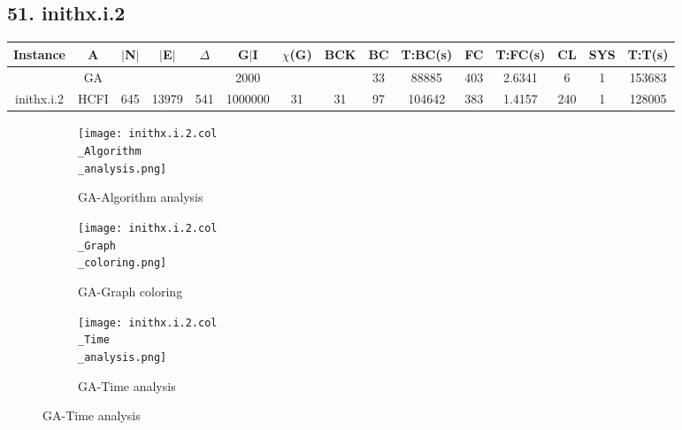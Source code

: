 \documentclass[10pt]{article}
\begin{document}
\subsection*{\hspace{0,9073976cm} 51. inithx.i.2}
\begin{table}[H]
\centering
\begin{tabular}{|c|c|c|c|c|c|c|c|c|c|c|c|c|c|c|}
\hline
Instance& A &$|$N$|$ & $|$E$|$ & $\Delta$ & G$|$I & $\chi$(G) &BCK&BC & T:BC(s) & FC & T:FC(s) & CL & SYS & T:T(s) \\ \hline \hline

	&GA&       &                   &                     &   2000     &     \cellcolor{yellow} & {\cellcolor{yellow}}& {{\cellcolor{green}33}}
&88885   &403        &2.6341                    &6                    &1          &153683         \\ \cline{2-2} \cline{6-6} \cline{9-15}
 \multirow{-2}{*}{inithx.i.2} &HCFI   &\multirow{-2}{*}{645}   &\multirow{-2}{*}{13979}     &\multirow{-2}{*}{541}     &1000000     &\multirow{-2}{*}{\cellcolor{yellow}31}      & \multirow{-2}{*}{\cellcolor{yellow}31}    &{\cellcolor{green}97}     &104642         &383    &1.4157         &240    &1     & 128005        \\ \hline
\end{tabular}
\end{table}
\graphicspath{{./Core1/Solutions/GA/inithx.i.2.col}}
\begin{figure}[H]
\begin{subfigure}{.33\textwidth}
  \centering
  \texttt{[image: inithx.i.2.col\\\_Algorithm\\\_analysis.png]}
  \caption{GA-Algorithm analysis}
   \label{fig:subfig1}
\end{subfigure}%
\begin{subfigure}{.33\textwidth}
  \centering
  \texttt{[image: inithx.i.2.col\\\_Graph\\\_coloring.png]}
  \caption{GA-Graph coloring}
  \label{fig:subfig2}
\end{subfigure}
\begin{subfigure}{.33\textwidth}
  \centering
  \texttt{[image: inithx.i.2.col\\\_Time\\\_analysis.png]}
  \caption{GA-Time analysis}
  \end{subfigure}
\end{figure}
\end{document}
